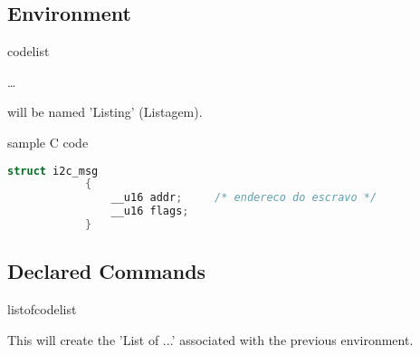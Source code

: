 \documentclass[dctools,english]{ufrgscca} %
\newif\iffulldoc
\begin{document}
\subsection{Environment}
\begin{Envs}{codelist}
	\begin{Syntax}%
		\Macro{\begin{codelist}}{}\ldots \Macro{\end{codelist}}{}
	\end{Syntax}
\Macro{\caption}{} will be named 'Listing' (Listagem).

\begin{stcode}[st=d.listing]
	\begin{codelist}[htbp]
		\caption{sample C code}
		\label{code01}
		\begin{lstlisting}[language=C]
			struct i2c_msg
			{
				__u16 addr;     /* endereco do escravo */
				__u16 flags;
			}
		\end{lstlisting}
		{\sourcecitation{\textcite{Garg:SMA-2000}}}
	\end{codelist}
\end{stcode}

\end{Envs}

\subsection{Declared Commands}
\begin{Macros}{listofcodelist}
	\begin{Syntax}%
		\Macro{\listofcodelist}{}
	\end{Syntax}
This will create the 'List of ...' associated with the previous environment.
\end{Macros}

\iffulldoc

\begin{Macros}{\DeclareNewFloat}
	\begin{Syntax}%
		\Macro{\DeclareNewFloat}{env-name,file-ext,listname,listofname}
	\end{Syntax}
A new float environment, named \Env{env-name}, will be created. Captions will be associated (numbered) as \textbf{\Arg{listname} num:}. Finally, an associated command \Macro{\listof...}{} will be defined, using \Arg{listofname} as a numberless \Macro{\chapter}{} title.

\begin{stcode}[st=d.float]
	\def\listingname{Listing}%
	\def\listlistingname{List of Listings}%
	\DeclareNewFloat{codelist}{lox}{\listingname}{\listlistingname}%
 	\listofcodelist
\end{stcode}

\DisplayCode[emph={codelist,listofcodelist}]{d.float}
\end{Macros}
\fi
\end{document}
